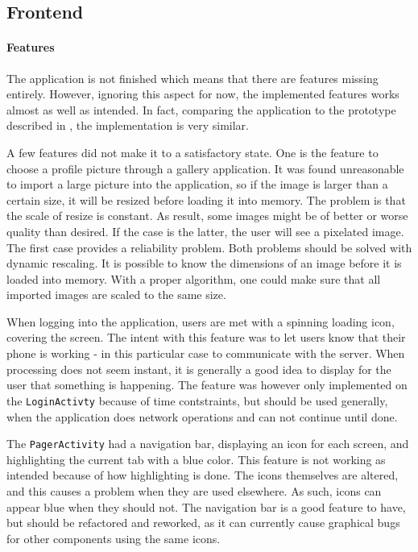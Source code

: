 \subsection{Frontend}
\label{subsec:frontend}

\paragraph{Features}
The application is not finished which means that there are features missing entirely. However, ignoring this aspect for now, the implemented features works almost as well as intended. In fact, comparing the application to the prototype described in , the implementation is very similar.

A few features did not make it to a satisfactory state. One is the feature to choose a profile picture through a gallery application. It was found unreasonable to import a large picture into the application, so if the image is larger than a certain size, it will be resized before loading it into memory. The problem is that the scale of resize is constant. As result, some images might be of better or worse quality than desired. If the case is the latter, the user will see a pixelated image. The first case provides a reliability problem.
Both problems should be solved with dynamic rescaling. It is possible to know the dimensions of an image before it is loaded into memory. With a proper algorithm, one could make sure that all imported images are scaled to the same size.

When logging into the application, users are met with a spinning loading icon, covering the screen. The intent with this feature was to let users know that their phone is working - in this particular case to communicate with the server. When processing does not seem instant, it is generally a good idea to display for the user that something is happening.
The feature was however only implemented on the \texttt{LoginActivty} because of time contstraints, but should be used generally, when the application does network operations and can not continue until done.

The \texttt{PagerActivity} had a navigation bar, displaying an icon for each screen, and highlighting the current tab with a blue color. This feature is not working as intended because of how highlighting is done. The icons themselves are altered, and this causes a problem when they are used elsewhere. As such, icons can appear blue when they should not. The navigation bar is a good feature to have, but should be refactored and reworked, as it can currently cause graphical bugs for other components using the same icons.

